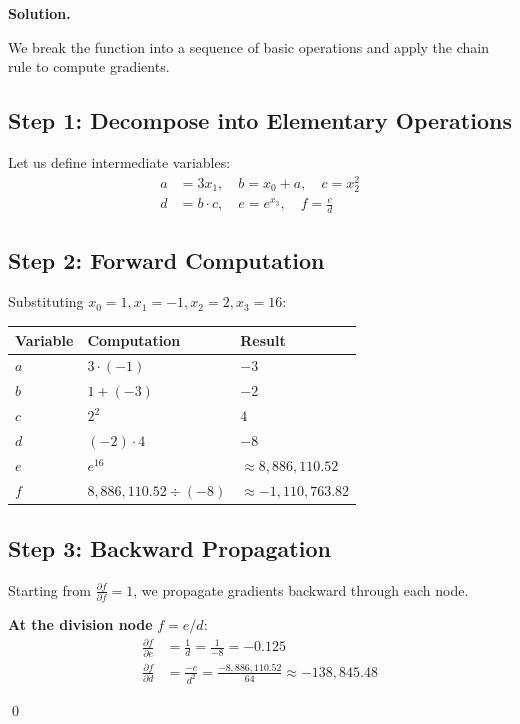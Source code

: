 \documentclass[10pt, a4paper]{article}
\newenvironment{Solution}{\textbf{Solution.}}{\qed}
\begin{document}
\begin{Solution}

We break the function into a sequence of basic operations and apply the chain rule to compute gradients.

\subsection*{Step 1: Decompose into Elementary Operations}

Let us define intermediate variables:
\begin{align*}
a &= 3x_1, \quad b = x_0 + a, \quad c = x_2^2 \\
d &= b \cdot c, \quad e = e^{x_3}, \quad f = \frac{e}{d}
\end{align*}

\subsection*{Step 2: Forward Computation}

Substituting $x_0=1, x_1=-1, x_2=2, x_3=16$:

\begin{center}
\begin{tabular}{lll}
\toprule
\textbf{Variable} & \textbf{Computation} & \textbf{Result} \\
\midrule
$a$ & $3 \cdot (-1)$ & $-3$ \\
$b$ & $1 + (-3)$ & $-2$ \\
$c$ & $2^2$ & $4$ \\
$d$ & $(-2) \cdot 4$ & $-8$ \\
$e$ & $e^{16}$ & $\approx 8{,}886{,}110.52$ \\
$f$ & $8{,}886{,}110.52 \div (-8)$ & $\approx -1{,}110{,}763.82$ \\
\bottomrule
\end{tabular}
\end{center}

\subsection*{Step 3: Backward Propagation}

Starting from $\frac{\partial f}{\partial f}=1$, we propagate gradients backward through each node.

\textbf{At the division node} $f = e/d$:
\begin{align*}
\frac{\partial f}{\partial e} &= \frac{1}{d} = \frac{1}{-8} = -0.125 \\[3pt]
\frac{\partial f}{\partial d} &= \frac{-e}{d^2} = \frac{-8{,}886{,}110.52}{64} \approx -138{,}845.48
\end{align*}


\end{Solution}
\end{document}
